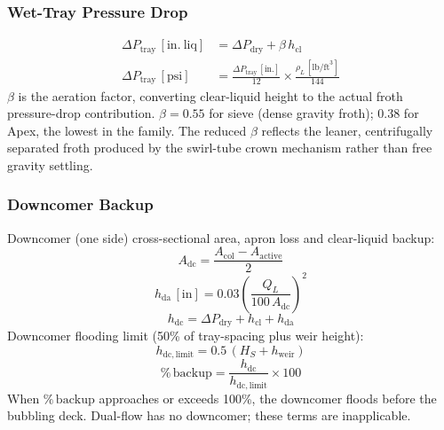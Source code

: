 \documentclass[11pt,letterpaper]{article}
\newcommand{\dpd}{\Delta P_{\mathrm{dry}}}
\newcommand{\dpt}{\Delta P_{\mathrm{tray}}}
\newcommand{\hcl}{h_{\mathrm{cl}}}
\newcommand{\hdc}{h_{\mathrm{dc}}}
\begin{document}
\subsubsection{Wet-Tray Pressure Drop}
\label{sec:dptray}

\begin{align}
  \dpt\,[\mathrm{in.\ liq}] &= \dpd + \beta\,\hcl \label{eq:dptray_in}\\
  \dpt\,[\mathrm{psi}]       &= \frac{\dpt\,[\mathrm{in.}]}{12}
                               \times\frac{\rho_L\,[\mathrm{lb/ft}^3]}{144}
  \label{eq:dptray_psi}
\end{align}
$\beta$ is the aeration factor, converting clear-liquid height to the
actual froth pressure-drop contribution.  $\beta = 0.55$ for sieve (dense
gravity froth); 0.38 for Apex, the lowest in the family.  The reduced $\beta$
reflects the leaner, centrifugally separated froth produced by the swirl-tube
crown mechanism rather than free gravity settling.

\subsubsection{Downcomer Backup}
\label{sec:dc}

Downcomer (one side) cross-sectional area, apron loss and clear-liquid backup:
\begin{equation}
  A_{\mathrm{dc}} = \frac{A_{\mathrm{col}} - A_{\mathrm{active}}}{2}
  \label{eq:adc}
\end{equation}
\begin{equation}
  h_{\mathrm{da}}\,[\mathrm{in}] = 0.03\left(\frac{Q_L}{100\,A_{\mathrm{dc}}}\right)^{2}
  \label{eq:hda}
\end{equation}
\begin{equation}
  \hdc = \dpd + \hcl + h_{\mathrm{da}}
  \label{eq:hdc}
\end{equation}
Downcomer flooding limit (50\% of tray-spacing plus weir height):
\begin{equation}
  h_{\mathrm{dc,limit}} = 0.5\,(H_S + h_{\mathrm{weir}})
  \label{eq:hdclimit}
\end{equation}
\begin{equation}
  \%\,\mathrm{backup} = \frac{\hdc}{h_{\mathrm{dc,limit}}}\times 100
  \label{eq:dcbackup}
\end{equation}
When $\%\,\mathrm{backup}$ approaches or exceeds 100\%, the downcomer floods
before the bubbling deck.  Dual-flow has no downcomer; these terms are
inapplicable.
\end{document}
